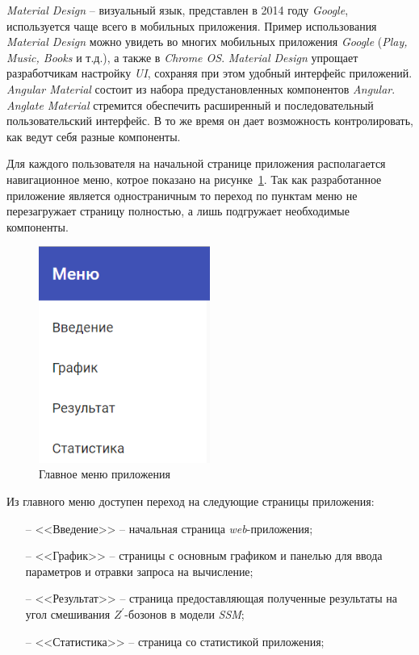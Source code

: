 \textit{Material Design} -- визуальный язык, представлен в 2014 году \textit{Google}, используется чаще всего в мобильных приложения. Пример использования \textit{Material Design} можно увидеть во многих мобильных приложения \textit{Google} (\textit{Play, Music, Books} и т.д.), а также в \textit{Chrome OS}. \textit{Material Design} упрощает разработчикам настройку \textit{UI}, сохраняя при этом удобный интерфейс приложений. \textit{Angular Material} состоит из набора предустановленных компонентов \textit{Angular}. \textit{Anglate Material} стремится обеспечить расширенный и последовательный пользовательский интерфейс. В то же время он дает возможность контролировать, как ведут себя разные компоненты.

Для каждого пользователя на начальной странице приложения располагается навигационное меню, котрое показано на рисунке~\ref{fig:menu}. Так как разработанное приложение является одностраничным то переход по пунктам меню не перезагружает страницу полностью, а лишь подгружает необходимые компоненты.

\begin{figure}[!h]
	\centering
	\includegraphics[width=0.5\textwidth]{figures/menu.png}
	\caption{Главное меню приложения}
	\label{fig:menu}
\end{figure}

Из главного меню доступен переход на следующие страницы приложения: 

\begin{enumerate}
	\item[--] <<Введение>> -- начальная страница \textit{web}-приложения;
	\item[--] <<График>> -- страницы с основным графиком и панелью для ввода параметров и отравки запроса на вычисление;
	\item[--] <<Результат>> -- страница предоставляющая полученные результаты на угол смешивания ${Z}^{\prime}$-бозонов в модели \textit{SSM};
	\item[--] <<Статистика>> -- страница со статистикой приложения;
\end{enumerate}

